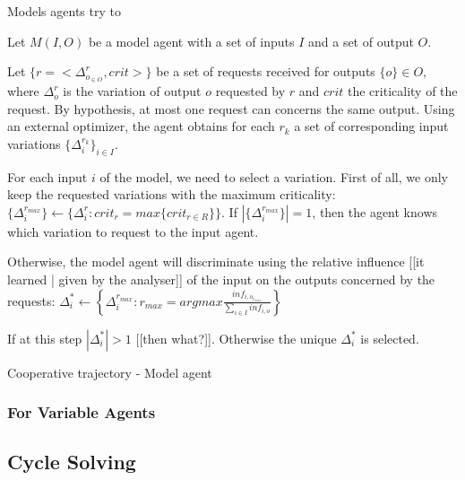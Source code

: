 Models agents try to 

Let $M(I,O)$ be a model agent with a set of inputs $I$ and a set of output $O$.

Let $\{r = <\Delta_{o_{\in O}}^{r}, crit>\}$ be a set of  requests received for outputs $\{o\} \in O$, where $\Delta_{o}^{r}$ is the variation of output $o$ requested by $r$ and $crit$ the criticality of the request. By hypothesis, at most one request can concerns the same output.
Using an external optimizer, the agent obtains for each $r_k$ a set of corresponding input variations $\{\Delta_i^{r_k}\}_{i \in I}$.

For each input $i$ of the model, we need to select a variation.
First of all, we only keep the requested variations with the maximum criticality:  $\{\Delta_i^{r_{max}}\} \leftarrow \{\Delta_i^r : crit_r = max \{crit_{r \in R}\}\}$.
If $|\{\Delta_i^{r_{max}}\}| =  1$, then the agent knows which variation to request to the input agent.

Otherwise, the model agent will discriminate using the relative influence [[it learned | given by the analyser]] of the input on the outputs concerned by the requests: 
$\Delta_i^* \leftarrow \left\{ \Delta_i^{r_{max}} : r_{max} = argmax \frac{inf_{i,o_{r_{max}}}}{\sum \limits_{i \in I} inf_{i,o}} \right\}$

If at this step $|\Delta_i^*| >1$ [[then what?]]. Otherwise the unique $\Delta_i^*$ is selected.

\begin{algorithm}
\caption{Cooperative trajectory - Model agent}
\label{algo_cooperative_trajectory_model}
\begin{algorithmic}
\end{algorithmic}
\end{algorithm}

\subsubsection{For Variable Agents}

\subsection{Cycle Solving}


